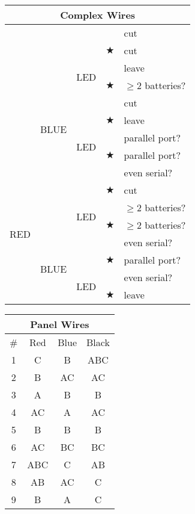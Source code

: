 \documentclass[11pt]{article}
\begin{document}
\begin{multicols}{2}
\begin{tabular}{|c|c|c|c|l|}
\hline
\multicolumn{5}{|c|}{Complex Wires} \\
\hline
\multirow{8}{*}{} & \multirow{4}{*}{} & \multirow{2}{*}{} & & cut \\
\cline{4-5}
 & & & $\bigstar$ & cut \\
\cline{3-5}
 & & \multirow{2}{*}{LED} & & leave \\
\cline{4-5}
 & & & $\bigstar$ & $\ge 2$ batteries? \\
\cline{2-5}
 & \multirow{4}{*}{BLUE} & & & cut \\
\cline{4-5}
 & & & $\bigstar$ & leave \\
\cline{3-5}
 & & \multirow{2}{*}{LED} & & parallel port? \\
\cline{4-5}
 & & & $\bigstar$ & parallel port? \\
\hline
\multirow{8}{*}{RED} & \multirow{4}{*}{} & \multirow{2}{*}{} & & even serial?\\
\cline{4-5}
 & & & $\bigstar$ & cut \\
\cline{3-5}
 & & \multirow{2}{*}{LED} & & $\ge 2$ batteries? \\
\cline{4-5}
 & & & $\bigstar$ & $\ge 2$ batteries? \\
\cline{2-5}
 & \multirow{4}{*}{BLUE} & & & even serial? \\
\cline{4-5}
 & & & $\bigstar$ & parallel port? \\
\cline{3-5}
 & & \multirow{2}{*}{LED} & & even serial? \\
\cline{4-5}
 & & & $\bigstar$ & leave \\
\hline
\end{tabular}

\begin{tabular}{|c|c|c|c|}
\hline
\multicolumn{4}{|c|}{Panel Wires} \\
\hline
\# & Red & Blue & Black \\
\hline
1  & C   & B   & ABC \\
2  & B   & AC  & AC  \\
3  & A   & B   & B   \\
4  & AC  & A   & AC  \\
5  & B   & B   & B   \\
6  & AC  & BC  & BC  \\
7  & ABC & C   & AB  \\
8  & AB  & AC  & C   \\
9  & B   & A   & C   \\
\hline
\end{tabular}

\end{multicols}
\end{document}
